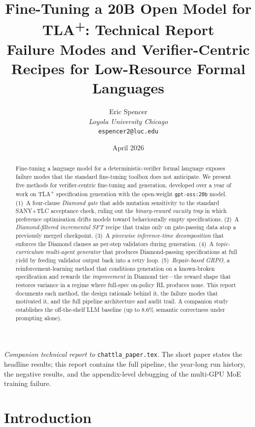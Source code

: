 \documentclass[11pt]{article}
\title{Fine-Tuning a 20B Open Model for TLA\textsuperscript{+}:
Technical Report\\
\large Failure Modes and Verifier-Centric Recipes for Low-Resource Formal Languages}
\author{Eric Spencer\\
\small \textit{Loyola University Chicago}\\
\small \texttt{espencer2@luc.edu}}
\date{April 2026}
\begin{document}
\maketitle

\begin{center}
\small
\textit{Companion technical report to} \texttt{chattla\_paper.tex}. The
short paper states the headline results; this report contains the full
pipeline, the year-long run history, the negative results, and the
appendix-level debugging of the multi-GPU MoE training failure.
\end{center}

\begin{abstract}
Fine-tuning a language model for a deterministic-verifier formal language
exposes failure modes that the standard fine-tuning toolbox does not
anticipate. We present five methods for verifier-centric fine-tuning and
generation, developed over a year of work on TLA\textsuperscript{+}
specification generation with the open-weight \texttt{gpt-oss:20b}
model. (1)~A four-clause \emph{Diamond gate} that adds mutation
sensitivity to the standard SANY+TLC acceptance check, ruling out
the \emph{binary-reward vacuity trap} in which preference optimisation
drifts models toward behaviourally empty specifications. (2)~A
\emph{Diamond-filtered incremental SFT} recipe that trains only on
gate-passing data atop a previously merged checkpoint.
(3)~A \emph{piecewise inference-time decomposition} that enforces
the Diamond clauses as per-step validators during generation.
(4)~A \emph{topic-curriculum multi-agent generator} that produces
Diamond-passing specifications at full yield by feeding validator
output back into a retry loop. (5)~\emph{Repair-based GRPO}, a
reinforcement-learning method that conditions generation on a
known-broken specification and rewards the \emph{improvement} in
Diamond tier---the reward shape that restores variance in a regime
where full-spec on-policy RL produces none. This report documents
each method, the design rationale behind it, the failure modes that
motivated it, and the full pipeline architecture and audit trail.
A companion study~\cite{ortiz2026formallm} establishes the
off-the-shelf LLM baseline (up to 8.6\% semantic correctness under
prompting alone).
\end{abstract}

\section{Introduction}
\label{sec:intro}
\end{document}
